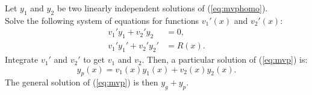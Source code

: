 \begin{mdframed}[style=boxstyle, frametitle={The Solution}]
	Let $y_1$ and $y_2$ be two linearly independent solutions of (\ref{eq:mvphomo}).\\
	Solve the following system of equations for functions $v_1'(x)$ and $v_2'(x)$:
	\begin{align*} 
		v_1'y_1 + v_2'y_2 &= 0,\\
		v_1'y_1' + v_2'y_2' &= R(x).
	\end{align*}
	Integrate $v_1'$ and $v_2'$ to get $v_1$ and $v_2.$ Then, a particular solution of (\ref{eq:mvp}) is:
	\begin{equation*} 
		y_p(x) = v_1(x)y_1(x) + v_2(x)y_2(x).
	\end{equation*}
	The general solution of (\ref{eq:mvp}) is then $y_g + y_p.$
\end{mdframed}
